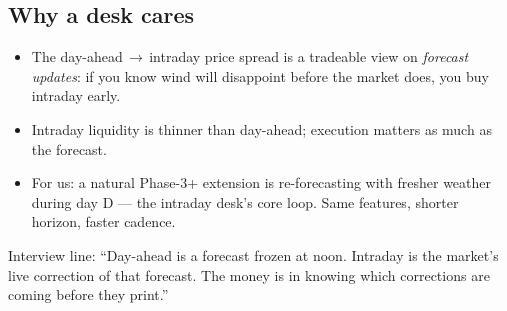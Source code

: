 \subsection{Why a desk cares}

\begin{itemize}
  \item The day-ahead\,$\to$\,intraday price spread is a tradeable view on
        \emph{forecast updates}: if you know wind will disappoint before
        the market does, you buy intraday early.
  \item Intraday liquidity is thinner than day-ahead; execution matters
        as much as the forecast.
  \item For us: a natural Phase-3+ extension is re-forecasting with
        fresher weather during day D --- the intraday desk's core loop.
        Same features, shorter horizon, faster cadence.
\end{itemize}

Interview line: ``Day-ahead is a forecast frozen at noon. Intraday is
the market's live correction of that forecast. The money is in knowing
which corrections are coming before they print.''
